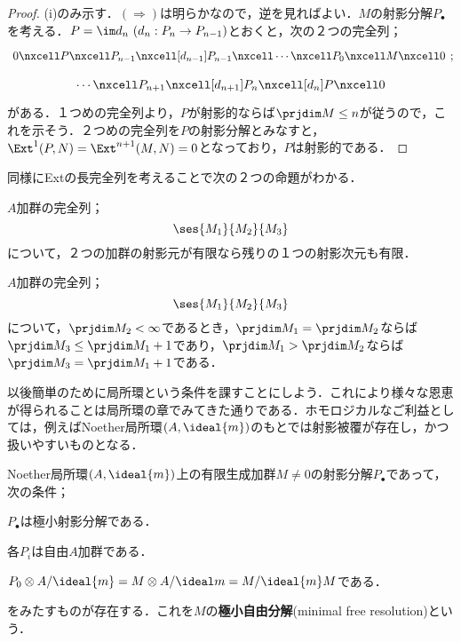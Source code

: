 \begin{proof}
	(i)のみ示す．$(\Longrightarrow)$は明らかなので，逆を見ればよい．$M$の射影分解$P_\bullet$を考える．$P=\im d_n~(d_n:P_n\to P_{n-1})$とおくと，次の２つの完全列；
	\[\begin{tikzcd}
	0\nxcell P\nxcell P_{n-1}\nxcell[d_{n-1}]P_{n-1}\nxcell\cdots\nxcell P_0\nxcell M\nxcell0\end{tikzcd};\]
	\[\begin{tikzcd}
	\cdots\nxcell P_{n+1}\nxcell[d_{n+1}]P_n\nxcell[d_n]P\nxcell0
	\end{tikzcd}\]
	がある．１つめの完全列より，$P$が射影的ならば$\prjdim M\leq n$が従うので，これを示そう．２つめの完全列を$P$の射影分解とみなすと，$\Ext^1(P,N)=\Ext^{n+1}(M,N)=0$となっており，$P$は射影的である．
\end{proof}

同様にExtの長完全列を考えることで次の２つの命題がわかる．
\begin{cor}\label{cor:prjdimの有限性}
	$A$加群の完全列；
	\[\ses{M_1}{M_2}{M_3}\]
	について，２つの加群の射影元が有限なら残りの１つの射影次元も有限．
\end{cor}

\begin{cor}\label{cor:prjdim lemma}
	$A$加群の完全列；
	\[\ses{M_1}{M_2}{M_3}\]
	について，$\prjdim M_2<\infty$であるとき，$\prjdim M_1=\prjdim M_2$ならば$\prjdim M_3\leq\prjdim M_1+1$であり，$\prjdim M_1>\prjdim M_2$ならば$\prjdim M_3=\prjdim M_1+1$である．
\end{cor}

以後簡単のために局所環という条件を課すことにしよう．これにより様々な恩恵が得られることは局所環の章でみてきた通りである．ホモロジカルなご利益としては，例えばNoether局所環$(A,\ideal{m})$のもとでは射影被覆が存在し，かつ扱いやすいものとなる．

\begin{defi}[極小自由分解]
	Noether局所環$(A,\ideal{m})$上の有限生成加群$M\neq0$の射影分解$P_\bullet$であって，次の条件；
	\begin{sakura}
		\item $P_\bullet$は極小射影分解である．
		\item 各$P_i$は自由$A$加群である．
		\item $P_0\otimes A/\ideal{m}=M\otimes A/\ideal m=M/\ideal{m}M$である．
	\end{sakura}
	をみたすものが存在する．これを$M$の\textbf{極小自由分解}(minimal free resolution)という．
\end{defi}

